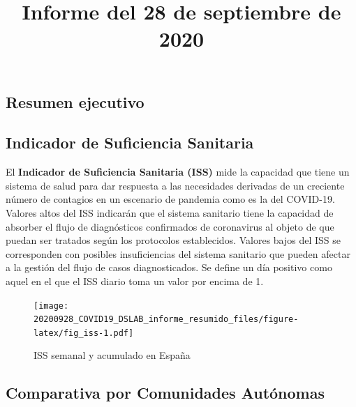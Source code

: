 \documentclass[
  11pt,
]{article}
\title{Informe del 28 de septiembre de 2020}
\author{}
\date{\vspace{-2.5em}}
\begin{document}
\maketitle

\renewcommand{\figurename}{Figura}
\renewcommand{\tablename}{Tabla}

\vspace{-0.5cm}

\hypertarget{resumen-ejecutivo}{%
\subsection{Resumen ejecutivo}\label{resumen-ejecutivo}}

\hypertarget{indicador-de-suficiencia-sanitaria}{%
\subsection{Indicador de Suficiencia
Sanitaria}\label{indicador-de-suficiencia-sanitaria}}

El \textbf{Indicador de Suficiencia Sanitaria (ISS)} mide la capacidad
que tiene un sistema de salud para dar respuesta a las necesidades
derivadas de un creciente número de contagios en un escenario de
pandemia como es la del COVID-19. Valores altos del ISS indicarán que el
sistema sanitario tiene la capacidad de absorber el flujo de
diagnósticos confirmados de coronavirus al objeto de que puedan ser
tratados según los protocolos establecidos. Valores bajos del ISS se
corresponden con posibles insuficiencias del sistema sanitario que
pueden afectar a la gestión del flujo de casos diagnosticados. Se define
un día positivo como aquel en el que el ISS diario toma un valor por
encima de 1.

\vspace{0.2cm}

\begin{figure}
\centering
\texttt{[image: 20200928\_COVID19\_DSLAB\_informe\_resumido\_files/figure-latex/fig\_iss-1.pdf]}
\caption{\label{fig:fig_iss} ISS semanal y acumulado en España}
\end{figure}

\clearpage

\hypertarget{comparativa-por-comunidades-autuxf3nomas}{%
\subsection{Comparativa por Comunidades
Autónomas}\label{comparativa-por-comunidades-autuxf3nomas}}
\end{document}
